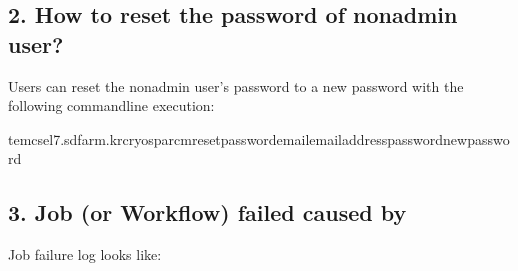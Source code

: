 \documentclass[a4paper,11pt,english]{sphinxmanual}
\begin{document}
\subsection{2. How to reset the password of non\sphinxhyphen{}admin user?}
\label{\detokenize{cryoSPARC:how-to-reset-the-password-of-non-admin-user}}
\sphinxAtStartPar
Users can reset the non\sphinxhyphen{}admin user’s password to a new password with the following command\sphinxhyphen{}line execution:

\begin{sphinxVerbatim}[commandchars=\\\{\}]
tem\PYGZhy{}cs\PYGZhy{}el7.sdfarm.kr\PYGZdl{}\PYGZgt{}cryosparcmresetpassword\PYGZhy{}\PYGZhy{}email\PYGZlt{}emailaddress\PYGZgt{}\PYGZhy{}\PYGZhy{}password\PYGZlt{}newpassword\PYGZgt{}
\end{sphinxVerbatim}


\subsection{3. Job (or Workflow) failed caused by }
\label{\detokenize{cryoSPARC:job-or-workflow-failed-caused-by-ssd-caching}}
\sphinxAtStartPar
Job failure log looks like:
\end{document}
